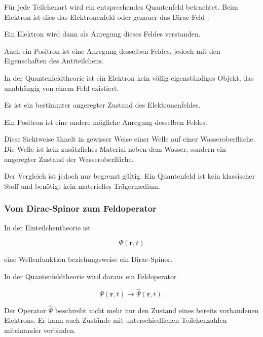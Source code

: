 Für jede Teilchenart wird ein entsprechendes Quantenfeld betrachtet.
Beim Elektron ist dies das Elektronenfeld%
 oder genauer das Dirac-Feld%
.

Ein Elektron wird dann als Anregung dieses Feldes verstanden.

Auch ein Positron ist eine Anregung desselben Feldes, jedoch mit den
Eigenschaften des Antiteilchens.

\begin{DidacticBox}
	\label{box:teilchen_als_feldanregungen}
	
	In der Quantenfeldtheorie ist ein Elektron kein völlig eigenständiges
	Objekt, das unabhängig von einem Feld existiert.
	
	Es ist ein bestimmter angeregter Zustand des Elektronenfeldes.
	
	Ein Positron ist eine andere mögliche Anregung desselben Feldes.
\end{DidacticBox}

Diese Sichtweise ähnelt in gewisser Weise einer Welle auf einer
Wasseroberfläche. Die Welle ist kein zusätzliches Material neben dem
Wasser, sondern ein angeregter Zustand der Wasseroberfläche.

Der Vergleich ist jedoch nur begrenzt gültig. Ein Quantenfeld ist kein
klassischer Stoff und benötigt kein materielles Trägermedium.

\subsubsection*{Vom Dirac-Spinor zum Feldoperator}

In der Einteilchentheorie ist

\begin{equation}
	\Psi(\mathbf{r},t)
\end{equation}

eine Wellenfunktion beziehungsweise ein Dirac-Spinor.

In der Quantenfeldtheorie wird daraus ein
Feldoperator

\begin{equation}
	\Psi(\mathbf{r},t)
	\longrightarrow
	\hat{\Psi}(\mathbf{r},t).
	\label{eq:dirac_spinor_zum_feldoperator}
\end{equation}

Der Operator \(\hat{\Psi}\) beschreibt nicht mehr nur den Zustand eines
bereits vorhandenen Elektrons. Er kann auch Zustände mit
unterschiedlichen Teilchenzahlen miteinander verbinden.

